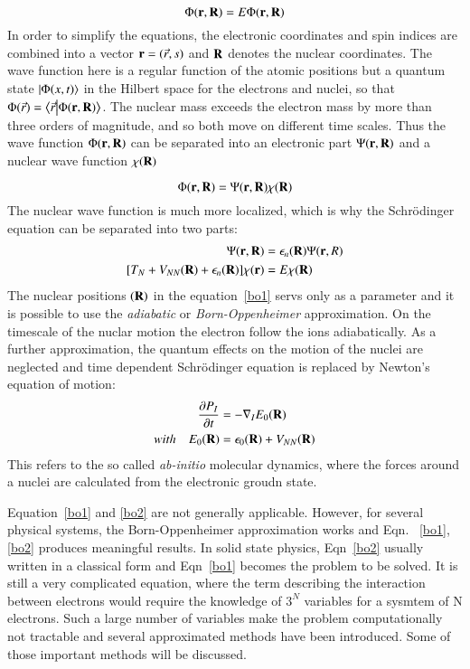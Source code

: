 \begin{equation}
 [T_e + T_N + V_{Ne}(\vb{r},\vb{R}) + V_{ee}(\vb{r}) + V_{NN}(\vb{r})]\Phi(\vb{r},\vb{R}) = E\Phi(\vb{r},\vb{R})
\end{equation}
In order to simplify the equations, the electronic coordinates and spin indices are combined into a vector $\vb{r} = (\vec{r},s)$ and $\vb{R}$ denotes the nuclear coordinates. The wave function here is a regular function of the atomic positions but a quantum state $\ket{\Phi(x,t)}$ in the Hilbert space for the electrons and nuclei, so that $\Phi(\vec{r}) = \braket{\vec{r}}{\Phi(\vb{r},\vb{R})}$. The nuclear mass exceeds the electron mass by more than three orders of magnitude, and so both move on different time scales. Thus the wave function $\Phi(\vb{r},\vb{R})$ can be separated into an electronic part $\Psi(\vb{r},\vb{R})$ and a nuclear wave function $\chi(\vb{R})$

\begin{equation}
\Phi(\vb{r},\vb{R}) = \Psi(\vb{r},\vb{R})\chi(\vb{R})
\end{equation}
The nuclear wave function is much more localized, which is why the Schr\"odinger equation can be separated into two parts:
\begin{align}
[T_e + V_{ee}(\vb{r}) + V_{Ne}(\vb{r},\vb{R})]\Psi(\vb{r},\vb{R}) & = \epsilon_n(\vb{R})\Psi(\vb{r},{R})\label{bo1} \\
[T_N + V_{NN}(\vb{R}) + \epsilon_n(\vb{R})]\chi(\vb{r}) & = E\chi(\vb{R})\label{bo2}
\end{align}
The nuclear positions $(\vb{R})$ in the equation~\eqref{bo1} servs only as a parameter and it is possible to use the \textit{adiabatic} or \textit{Born-Oppenheimer} approximation. On the timescale of the nuclar motion the electron follow the ions adiabatically. As a further approximation, the quantum effects on the motion of the nuclei are neglected and time dependent Schr\"odinger equation is replaced by Newton's equation of motion:
\begin{align}
\frac{\partial P_I}{\partial t} & = -\nabla_I E_0 (\vb{R}) \\
with \quad E_0(\vb{R}) & = \epsilon_0(\vb{R}) + V_{NN}(\vb{R})
\end{align}
This refers to the so called \textit{ab-initio} molecular dynamics, where the forces around a nuclei are calculated from the electronic groudn state.

Equation~\ref{bo1} and \ref{bo2} are not generally applicable. However, for several physical systems, the Born-Oppenheimer approximation works and Eqn. ~\ref{bo1}, \ref{bo2} produces meaningful results. In solid state physics, Eqn~\eqref{bo2} usually written in a classical form and Eqn~\eqref{bo1} becomes the problem to be solved. It is still a very complicated equation, where the term describing the interaction between electrons would require the knowledge of $3^N$ variables for a sysmtem of N electrons. Such a large number of variables make the problem computationally not tractable and several approximated methods have been introduced. Some of those important methods will be discussed.

